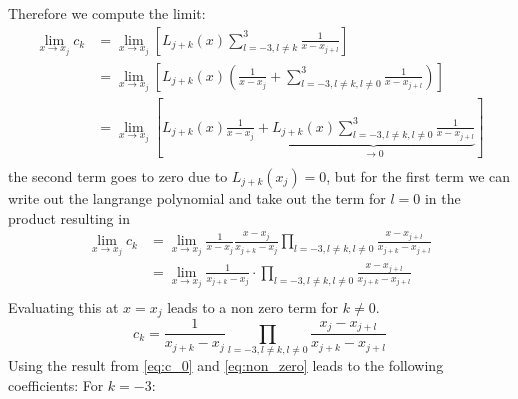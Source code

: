 Therefore we compute the limit:
\begin{equation}
	\begin{aligned}
		\lim_{x \rightarrow x_j} c_k & = \lim_{x \rightarrow x_j} \left [ L_{j+k}(x)  \sum_{l=-3, l \neq k}^3 \frac{1}{x - x_{j+l}} \right ]                                                                         \\
		                             & = \lim_{x \rightarrow x_j} \left [ L_{j+k}(x) \left (  \frac{1}{x - x_j} + \sum_{l=-3, l \neq k, l \neq 0}^3 \frac{1}{x - x_{j+l}} \right ) \right ]                          \\
		                             & = \lim_{x \rightarrow x_j} \left [ L_{j+k}(x)  \frac{1}{x - x_j}  + \underbrace{L_{j+k}(x) \sum_{l=-3, l \neq k, l \neq 0}^3 \frac{1}{x - x_{j+l}} }_{\rightarrow 0} \right ] \\
	\end{aligned}
	\label{eq:lim_c_k}
\end{equation}
the second term goes to zero due to $L_{j+k}(x_j) = 0$, but for the first term we can write out the langrange polynomial and take out the term for $l=0$ in the product resulting in
\begin{equation}
	\begin{aligned}
		\lim_{x \rightarrow x_j} c_k & =  \lim_{x \rightarrow x_j} \frac{1}{x - x_j} \frac{x - x_j}{x_{j+k} - x_j} \prod_{l=-3, l \neq k, l \neq 0} \frac{x - x_{j+l}}{x_{j+k} - x_{j+l}} \\
		                             & =  \lim_{x \rightarrow x_j} \frac{1}{x_{j+k} - x_j} \cdot \prod_{l=-3, l \neq k, l \neq 0} \frac{x - x_{j+l}}{x_{j+k} - x_{j+l}}                   \\
		\label{eq:yep}
	\end{aligned}
\end{equation}
Evaluating this at $x = x_j$ leads to a non zero term for $k \neq 0$.
\begin{equation}
	c_k = \frac{1}{x_{j+k} - x_j} \prod_{l=-3, l \neq k, l \neq 0} \frac{x_j - x_{j+l}}{x_{j+k} - x_{j+l}}
	\label{eq:non_zero}
\end{equation}
Using the result from \eqref{eq:c_0} and \eqref{eq:non_zero} leads to the following coefficients:\newline
For $k=-3$:
